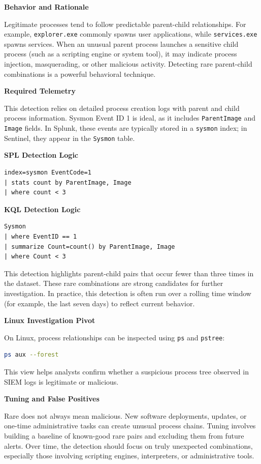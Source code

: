 \textbf{Behavior and Rationale}

Legitimate processes tend to follow predictable parent-child relationships. For example, \texttt{explorer.exe} commonly 
spawns user applications, while \texttt{services.exe} spawns services. When an unusual parent process launches a sensitive 
child process (such as a scripting engine or system tool), it may indicate process injection, masquerading, or other malicious activity.
Detecting rare parent-child combinations is a powerful behavioral technique.

\textbf{Required Telemetry}

This detection relies on detailed process creation logs with parent and child process information. 
Sysmon Event ID 1 is ideal, as it includes \texttt{ParentImage} and \texttt{Image} fields. In Splunk, 
these events are typically stored in a \texttt{sysmon} index; in Sentinel, they appear in the \texttt{Sysmon} table.

\textbf{SPL Detection Logic}
\begin{lstlisting}
index=sysmon EventCode=1
| stats count by ParentImage, Image
| where count < 3
\end{lstlisting}

\textbf{KQL Detection Logic}
\begin{lstlisting}
Sysmon
| where EventID == 1
| summarize Count=count() by ParentImage, Image
| where Count < 3
\end{lstlisting}

This detection highlights parent-child pairs that occur fewer than three times in the dataset. 
These rare combinations are strong candidates for further investigation. In practice, this detection 
is often run over a rolling time window (for example, the last seven days) to reflect current behavior.

\textbf{Linux Investigation Pivot}

On Linux, process relationships can be inspected using \texttt{ps} and \texttt{pstree}:

\begin{lstlisting}[language=bash]
ps aux --forest
\end{lstlisting}

This view helps analysts confirm whether a suspicious process tree observed in SIEM logs is legitimate or malicious.

\textbf{Tuning and False Positives}

Rare does not always mean malicious. New software deployments, updates, or one-time administrative tasks can create 
unusual process chains. Tuning involves building a baseline of known-good rare pairs and excluding them from future 
alerts. Over time, the detection should focus on truly unexpected combinations, especially those involving 
scripting engines, interpreters, or administrative tools.

